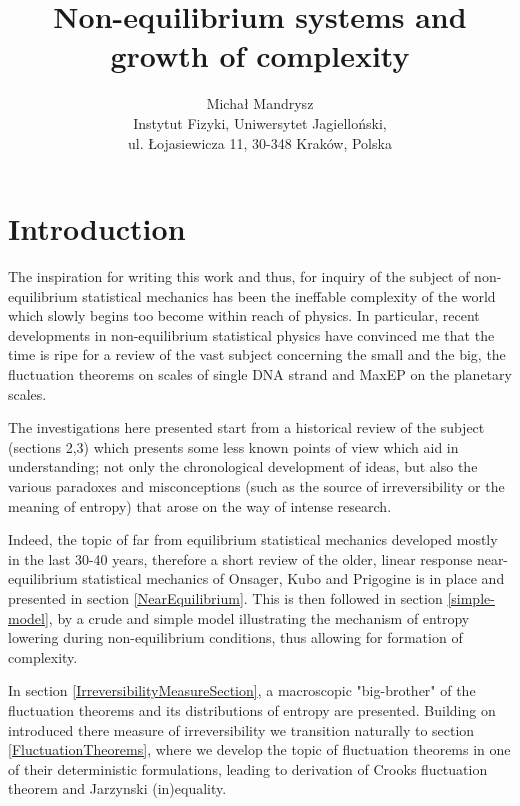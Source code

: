 \documentclass[a4paper,12pt]{article}
\begin{document}
\title{Non-equilibrium systems and growth of complexity}

\author{Michał Mandrysz \\
Instytut Fizyki, Uniwersytet Jagielloński, \\ul. Łojasiewicza
11, 30-348 Kraków, Polska }

\maketitle

\tableofcontents

\newpage

\section{Introduction}

The inspiration for writing this work and thus, for inquiry of the subject of non-equilibrium statistical mechanics has been the ineffable complexity of the world which slowly begins too become within reach of physics. 
In particular, recent developments in non-equilibrium statistical physics have convinced me that the time is ripe for a review of the vast subject concerning the small and the big, the fluctuation theorems on scales of single DNA strand and MaxEP on the planetary scales.

The investigations here presented start from a historical review of the subject (sections 2,3) which presents some less known points of view which aid in understanding; not only the chronological development of ideas, but also the various paradoxes and misconceptions (such as the source of irreversibility or the meaning of entropy) that arose on the way of intense research. 

Indeed, the topic of far from equilibrium statistical mechanics developed mostly in the last 30-40 years, therefore a short review of the older, linear response near-equilibrium statistical mechanics of Onsager, Kubo and Prigogine is in place and presented in section \ref{NearEquilibrium}. This is then followed in section \ref{simple-model}, by a crude and simple model illustrating the mechanism of entropy lowering during non-equilibrium conditions, thus allowing for formation of complexity.

In section \ref{IrreversibilityMeasureSection},  a macroscopic "big-brother" of the fluctuation theorems and its distributions of entropy are presented. Building on introduced there measure of irreversibility we transition naturally to section \ref{FluctuationTheorems}, where we develop the topic of fluctuation theorems in one of their deterministic formulations, leading to derivation of Crooks fluctuation theorem and Jarzynski (in)equality.
\end{document}

